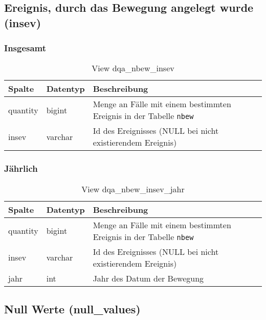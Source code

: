 \newpage

\subsection{Ereignis, durch das Bewegung angelegt wurde (insev)} \label{subsec:bewEreig}

\subsubsection{Insgesamt} \label{subsubsec:bewEreigI}

\begin{table}[ht]
	\centering   
	\caption{View dqa\_nbew\_insev}
	\label{tab:bewEreigI}
	\begin{tabular}{||l|l|p{10cm}||}   		
		\hline
		Spalte & Datentyp & Beschreibung \\ [0.5ex]
		\hline\hline
		quantity & bigint & Menge an Fälle mit einem bestimmten Ereignis in der Tabelle \texttt{nbew} \\
		\hline
		insev & varchar & Id des Ereignisses (NULL bei nicht existierendem Ereignis)\\
		\hline
		
	\end{tabular}
\end{table}

\subsubsection{Jährlich} \label{subsubsec:bewEreigJ}

\begin{table}[ht]
	\centering   
	\caption{View dqa\_nbew\_insev\_jahr}
	\label{tab:bewEreigJ}
	\begin{tabular}{||l|l|p{10cm}||}   		
		\hline
		Spalte & Datentyp & Beschreibung \\ [0.5ex]
		\hline\hline
		quantity & bigint & Menge an Fälle mit einem bestimmten Ereignis in der Tabelle \texttt{nbew}\\
		\hline
		insev & varchar & Id des Ereignisses (NULL bei nicht existierendem Ereignis)\\
		\hline
		jahr & int &  Jahr des Datum der Bewegung \\
		\hline		
	\end{tabular}
\end{table}
\newpage
\subsection{Null Werte (null\_values)} \label{subsec:bewNull}


